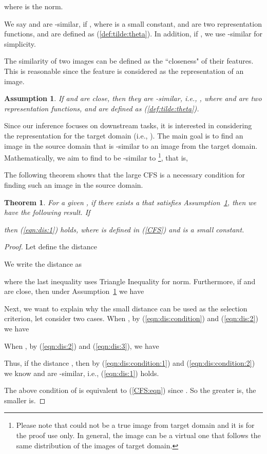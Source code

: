 \documentclass[10pt,twocolumn,letterpaper]{article}
\newtheorem{thm}{Theorem}
\newtheorem{ass}{Assumption}
\begin{document}
where  is the norm.
\begin{definition}
We say  and  are -similar, if , where  is a small constant,  and  are two representation functions,  and  are defined as (\ref{def:tilde:theta}). In addition, if , we use -similar for simplicity.
\end{definition}
The similarity of two images can be defined as the ``closeness" of their features. This is reasonable since the feature is considered as the representation of an image.
\begin{ass}\label{ass:similarity}
If  and  are close, then they are -similar, i.e.,
,
where  and  are two representation functions,  and  are defined as (\ref{def:tilde:theta}).
\end{ass}
Since our inference focuses on downstream tasks, it is interested in considering the representation for the target domain (i.e., ). The main goal is to find an image in the source domain that is -similar to an image from the target domain. Mathematically, we aim to find  to be -similar to \footnote{Please note that  could not be a true image from target domain and it is for the proof use only. In general, the image  can be a virtual one that follows the same distribution of the images of target domain.}, that is,

The following theorem shows that the large CFS is a necessary condition for finding such an image in the source domain.
\begin{thm}\label{main:CFS}
For a given , if there exists a  that satisfies Assumption~\ref{ass:similarity}, then we have the following result. If

then (\ref{eqn:dis:1}) holds, where  is defined in (\ref{CFS}) and  is a small constant.
\end{thm}

\begin{proof}\renewcommand{\qedsymbol}{}Let define the distance 

We write the distance  as

where the last inequality uses Triangle Inequality for norm. 
Furthermore, if  and  are close, then under Assumption~\ref{ass:similarity} we have

Next, we want to explain why the small distance  can be used as the selection criterion, let consider two cases. When , by (\ref{eqn:dis:condition}) and (\ref{eqn:dis:2}) we have

When , by (\ref{eqn:dis:2}) and (\ref{eqn:dis:3}), we have

Thus, if the distance , then by (\ref{eqn:dis:condition:1}) and (\ref{eqn:dis:condition:2}) we know  and  are -similar, i.e., (\ref{eqn:dis:1}) holds.

The above condition of  is equivalent to (\ref{CFS:eqn}) since . So the greater  is, the smaller  is.
\end{proof}
\end{document}
